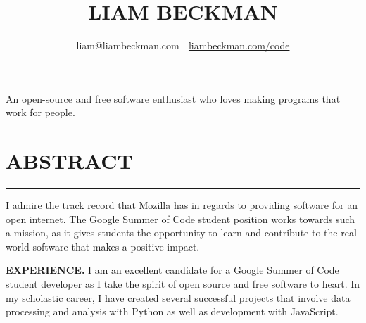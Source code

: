

\renewcommand{\labelitemi}{$\triangleright$}
\setlength{\parskip}{1em}

\title{\vspace{-3em}\textcolor{my-red}{LIAM BECKMAN}}
\author{liam@liambeckman.com | \href{https://liambeckman.com/code}{liambeckman.com/code}}

\date{\vspace{-5ex}}



\maketitle

\begin{center}
An open-source and free software enthusiast who loves making programs that work for people.
\end{center}

\newcommand{\myTitle}[1] {
    \vspace{-1.5em}
    \section*{\large{#1}}\vspace{-1.7em}
    \textcolor{my-grey}{\rule{\linewidth}{0.5pt}}
    \vspace{-1em}
}

\newcommand{\showoff}[4] {
    \textcolor{my-blue}{\textbf{#1}} --- #2\\
    \textcolor{my-grey}{#3 \hfill #4}
    \medskip
}

\newcommand{\myBreak} {
    \textcolor{my-grey}{\dotfill}
}

\newcommand{\myItem}[1] {
    \item\textcolor{my-blue}{\textbf{#1}} ---
}

\myTitle{ABSTRACT}

I admire the track record that Mozilla has in regards to providing software for an open internet. The Google Summer of Code student position works towards such a mission, as it gives students the opportunity to learn and contribute to the real-world software that makes a positive impact.

\textbf{EXPERIENCE.} I am an excellent candidate for a Google Summer of Code student developer as I take the spirit of open source and free software to heart. In my scholastic career, I have created several successful projects that involve data processing and analysis with Python as well as development with JavaScript.

